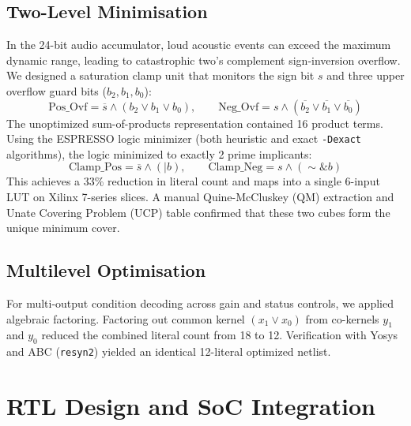 \documentclass[11pt,a4paper]{article}
\begin{document}
\subsection{Two-Level Minimisation}
In the 24-bit audio accumulator, loud acoustic events can exceed the maximum dynamic range, leading to catastrophic two's complement sign-inversion overflow. We designed a saturation clamp unit that monitors the sign bit $s$ and three upper overflow guard bits ($b_2, b_1, b_0$):
\begin{equation}
  \text{Pos\_Ovf} = \overline{s} \land (b_2 \lor b_1 \lor b_0), \qquad \text{Neg\_Ovf} = s \land (\overline{b_2} \lor \overline{b_1} \lor \overline{b_0})
  \label{eq:sat_logic}
\end{equation}
The unoptimized sum-of-products representation contained 16 product terms. Using the ESPRESSO logic minimizer (both heuristic and exact \texttt{-Dexact} algorithms), the logic minimized to exactly 2 prime implicants:
\begin{equation}
  \text{Clamp\_Pos} = \overline{s} \land (|b), \qquad \text{Clamp\_Neg} = s \land (\sim\&b)
  \label{eq:sat_min}
\end{equation}
This achieves a 33\% reduction in literal count and maps into a single 6-input LUT on Xilinx 7-series slices. A manual Quine-McCluskey (QM) extraction and Unate Covering Problem (UCP) table confirmed that these two cubes form the unique minimum cover.

\subsection{Multilevel Optimisation}
For multi-output condition decoding across gain and status controls, we applied algebraic factoring. Factoring out common kernel $(x_1 \lor x_0)$ from co-kernels $y_1$ and $y_0$ reduced the combined literal count from 18 to 12. Verification with Yosys and ABC (\texttt{resyn2}) yielded an identical 12-literal optimized netlist.

\section{RTL Design and SoC Integration}
\label{sec:rtl}
\end{document}
